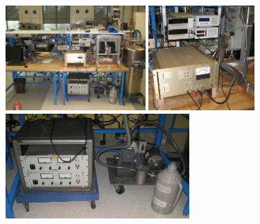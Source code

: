 \documentclass{../lab}
\begin{document}
\noindent
\href{http://experimentationlab.berkeley.edu/sites/default/files/images/SHE_3541-2.jpg}{\includegraphics[width=0.33\linewidth,height=4cm,keepaspectratio]{images/SHE_3541-2.jpg}}
\href{http://experimentationlab.berkeley.edu/sites/default/files/images/SHE_Electronics_3546_Crop.jpg}{\includegraphics[width=0.33\linewidth,height=4cm,keepaspectratio]{images/SHE_Electronics_3546_Crop.jpg}}
\href{http://experimentationlab.berkeley.edu/sites/default/files/images/SHE_Mag_Pwr_Crop_3547.jpg}{\includegraphics[height=4cm,keepaspectratio]{images/SHE_Mag_Pwr_Crop_3547.jpg}} \\
\end{document}

